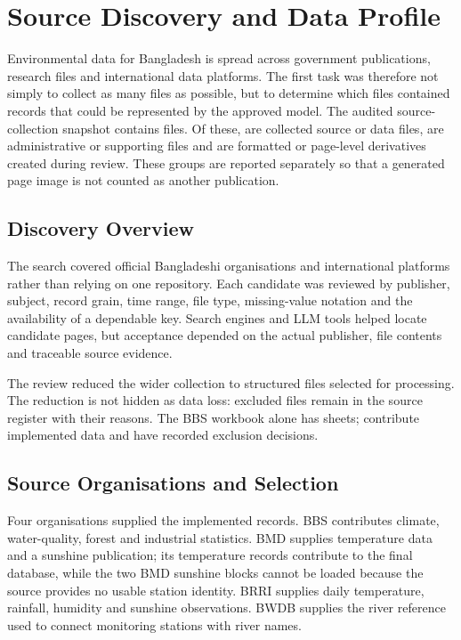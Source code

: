 \section{Source Discovery and Data Profile}
\label{sec:data}

Environmental data for Bangladesh is spread across government publications,
research files and international data platforms. The first task was therefore
not simply to collect as many files as possible, but to determine which files
contained records that could be represented by the approved model. The audited
source-collection snapshot contains \mAllDriveFiles{} files. Of these,
\mSourceDataFiles{} are collected source or data files, \mSupportFiles{} are
administrative or supporting files and \mDerivedArtifacts{} are formatted or
page-level derivatives created during review. These groups are reported
separately so that a generated page image is not counted as another publication.

\subsection{Discovery Overview}
\label{subsec:source-discovery}

The search covered official Bangladeshi organisations and international
platforms rather than relying on one repository. Each candidate was reviewed by
publisher, subject, record grain, time range, file type, missing-value notation
and the availability of a dependable key. Search engines and LLM tools helped
locate candidate pages, but acceptance depended on the actual publisher, file
contents and traceable source evidence.

The review reduced the wider collection to \mSourceFiles{} structured files
selected for processing. The reduction is not hidden as data loss: excluded files
remain in the source register with their reasons. The BBS workbook alone has
\mSheetsTotal{} sheets; \mSheetsUsed{} contribute implemented data and
\mSheetsExcluded{} have recorded exclusion decisions.

\subsection{Source Organisations and Selection}
\label{subsec:source-organisations}

Four organisations supplied the implemented records. BBS contributes climate,
water-quality, forest and industrial statistics. BMD supplies temperature data
and a sunshine publication; its temperature records contribute to the final
database, while the two BMD sunshine blocks cannot be loaded because the source
provides no usable station identity. BRRI supplies daily temperature,
rainfall, humidity and sunshine observations. BWDB supplies the river reference
used to connect monitoring stations with river names.

